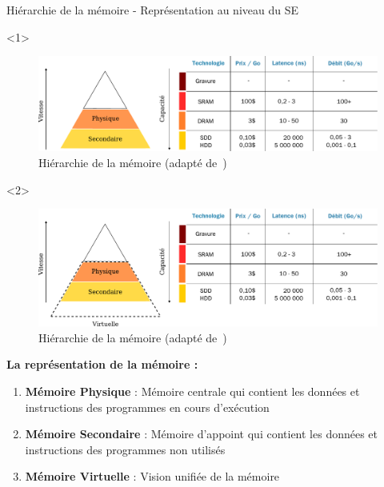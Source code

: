 \documentclass[8pt]{beamer}
\begin{document}
\begin{frame}{Hiérarchie de la mémoire - Représentation au niveau du SE}
    \begin{onlyenv}<1>
        \begin{figure}
            \centering

            \includegraphics[width=\linewidth]{figures/hierarchy_memory_virtual.pdf}
            \caption{Hiérarchie de la mémoire (adapté
                de~\cite{harris2021digital})}
        \end{figure}
    \end{onlyenv}
    \begin{onlyenv}<2>
        \begin{figure}
            \centering

            \includegraphics[width=\linewidth]{figures/hierarchy_memory_virtual_physic.pdf}
            \caption{Hiérarchie de la mémoire (adapté
                de~\cite{harris2021digital})}
        \end{figure}
    \end{onlyenv}

    \textbf{La représentation de la mémoire :}
    \begin{enumerate}
        \item \textbf{Mémoire Physique} : Mémoire centrale qui contient
              les
              données et instructions des programmes en cours d'exécution
        \item \textbf{Mémoire Secondaire} : Mémoire d'appoint qui
              contient
              les données et instructions des programmes non utilisés
        \item<2> \textbf{Mémoire Virtuelle} : Vision unifiée de la
            mémoire

    \end{enumerate}
\end{frame}
\end{document}

